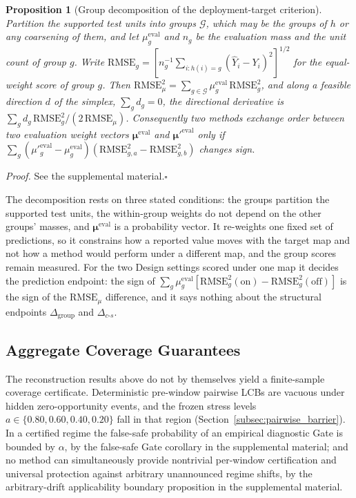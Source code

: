 \documentclass[letterpaper,journal]{IEEEtran}
\newtheorem{proposition}{Proposition}
\begin{document}
\begin{proposition}[Group decomposition of the deployment-target criterion]
\label{prop:group_decomposition}
Partition the supported test units into groups $\mathcal G$, which may be the
groups of $h$ or any coarsening of them, and let $\mu^{\mathrm{eval}}_g$ and
$n_g$ be the evaluation mass and the unit count of group $g$.  Write
$\mathrm{RMSE}_g=[n_g^{-1}\sum_{i:h(i)=g}(\widehat Y_i-Y_i)^2]^{1/2}$ for the
equal-weight score of group $g$.  Then
$\mathrm{RMSE}_{\mu}^2=\sum_{g\in\mathcal G}\mu^{\mathrm{eval}}_g\,\mathrm{RMSE}_g^2$,
and along a feasible direction $d$ of the simplex, $\sum_g d_g=0$, the
directional derivative is
$\sum_g d_g\,\mathrm{RMSE}_g^2/(2\,\mathrm{RMSE}_{\mu})$.  Consequently two
methods exchange order between two evaluation weight vectors
$\boldsymbol\mu^{\mathrm{eval}}$ and $\boldsymbol\mu'^{\mathrm{eval}}$ only if
$\sum_g(\mu'^{\mathrm{eval}}_g-\mu^{\mathrm{eval}}_g)
(\mathrm{RMSE}_{g,a}^2-\mathrm{RMSE}_{g,b}^2)$ changes sign.
\end{proposition}

\noindent\emph{Proof.}
See the supplemental material.\hfill$\square$

\noindent The decomposition rests on three stated conditions: the groups
partition the supported test units, the within-group weights do not depend on
the other groups' masses, and $\boldsymbol\mu^{\mathrm{eval}}$ is a probability
vector.  It re-weights one fixed set of predictions, so it constrains how a
reported value moves with the target map and not how a method would perform
under a different map, and the group scores remain measured.  For the two
Design settings scored under one map it decides the prediction endpoint: the
sign of $\sum_g\mu^{\mathrm{eval}}_g[\mathrm{RMSE}_g^2(\mathrm{on})-
\mathrm{RMSE}_g^2(\mathrm{off})]$ is the sign of the
$\mathrm{RMSE}_{\mu}$ difference, and it says nothing about the structural
endpoints $\Delta_{\mathrm{group}}$ and $\Delta_{c\text{-}s}$.

\subsection{Aggregate Coverage Guarantees}
\label{subsec:agg_coverage_theory}

The reconstruction results above do not by themselves yield a finite-sample
coverage certificate.  Deterministic pre-window pairwise LCBs are vacuous
under hidden zero-opportunity events, and the frozen stress levels
$a\in\{0.80,0.60,0.40,0.20\}$ fall in that region
(Section~\ref{subsec:pairwise_barrier}).  In a certified regime the
false-safe probability of an empirical diagnostic Gate is bounded by
$\alpha$, by the false-safe Gate corollary in the supplemental material; and
no method can simultaneously provide nontrivial per-window certification and
universal protection against arbitrary unannounced regime shifts, by the
arbitrary-drift applicability boundary proposition in the supplemental
material.
\end{document}

